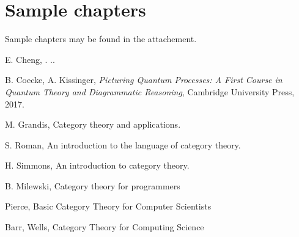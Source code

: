 \documentclass[10pt, article, one side]{memoir}
\begin{document}
    \chapter{Sample chapters}
   Sample chapters may be found in the attachement. 

    
    

    \begin{thebibliography}{00}

        E.
        Cheng, .
        ..

        B.
        Coecke, A.
        Kissinger,
        \emph{Picturing Quantum Processes: A First Course in Quantum Theory and Diagrammatic Reasoning},
        Cambridge University Press, 2017.

        M.
        Grandis, Category theory and applications.

        S.
        Roman, An introduction to the language of category theory.

        H.
        Simmons, An introduction to category theory.

        B.
        Milewski, Category theory for programmers

         Pierce, Basic Category Theory for Computer Scientists

         Barr, Wells, Category Theory for Computing Science

    \end{thebibliography}
\end{document}
